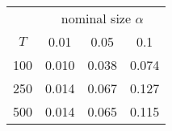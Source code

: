 % 
\begin{tabular}{cccc}
  \hline
  & \multicolumn{3}{c}{nominal size $\alpha$} \\
 $T$ & 0.01 & 0.05 & 0.1 \\
 \hline
100 & 0.010 & 0.038 & 0.074 \\ 
  250 & 0.014 & 0.067 & 0.127 \\ 
  500 & 0.014 & 0.065 & 0.115 \\ 
   \hline
\end{tabular}
